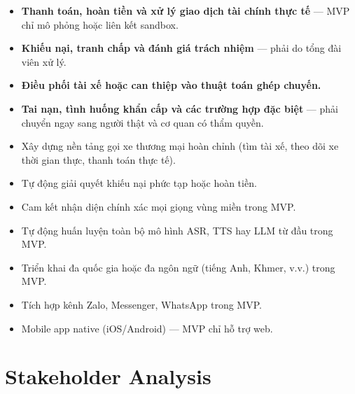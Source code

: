 \documentclass[12pt,a4paper]{article}
\begin{document}
\begin{itemize}
  \item \textbf{Thanh toán, hoàn tiền và xử lý giao dịch tài chính thực tế} --- MVP chỉ mô phỏng hoặc liên kết sandbox.
  \item \textbf{Khiếu nại, tranh chấp và đánh giá trách nhiệm} --- phải do tổng đài viên xử lý.
  \item \textbf{Điều phối tài xế hoặc can thiệp vào thuật toán ghép chuyến.}
  \item \textbf{Tai nạn, tình huống khẩn cấp và các trường hợp đặc biệt} --- phải chuyển ngay sang người thật và cơ quan có thẩm quyền.
  \item Xây dựng nền tảng gọi xe thương mại hoàn chỉnh (tìm tài xế, theo dõi xe thời gian thực, thanh toán thực tế).
  \item Tự động giải quyết khiếu nại phức tạp hoặc hoàn tiền.
  \item Cam kết nhận diện chính xác mọi giọng vùng miền trong MVP.
  \item Tự động huấn luyện toàn bộ mô hình ASR, TTS hay LLM từ đầu trong MVP.
  \item Triển khai đa quốc gia hoặc đa ngôn ngữ (tiếng Anh, Khmer, v.v.) trong MVP.
  \item Tích hợp kênh Zalo, Messenger, WhatsApp trong MVP.
  \item Mobile app native (iOS/Android) --- MVP chỉ hỗ trợ web.
\end{itemize}

\section{Stakeholder Analysis}
\end{document}
